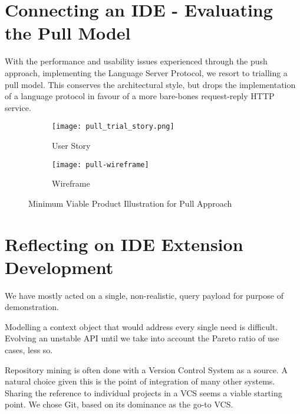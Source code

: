 \section{Connecting an IDE - Evaluating the Pull Model}

With the performance and usability issues experienced through the push approach, implementing the Language Server Protocol, we resort to trialling a pull model. This conserves the architectural style, but drops the implementation of a language protocol in favour of a more bare-bones request-reply HTTP service. 

\begin{figure}[h!]
	\centering
	\begin{subfigure}[t]{0.3\textwidth}
		\texttt{[image: pull\_trial\_story.png]}
		\caption{User Story}
	\end{subfigure}
	\begin{subfigure}[t]{0.6\textwidth}
		\texttt{[image: pull-wireframe]}
		\caption{Wireframe}
	\end{subfigure}
	\label{fig:mvpPull}
	\caption{Minimum Viable Product Illustration for Pull Approach}
\end{figure}

\section{Reflecting on IDE Extension Development}
We have mostly acted on a single, non-realistic, query payload for purpose of demonstration. 


Modelling a context object that would address every single need is difficult. Evolving an unstable API until we take into account the Pareto ratio of use cases, less so. 

Repository mining is often done with a Version Control System as a source. A natural choice given this is the point of integration of many other systems. Sharing the reference to individual projects in a VCS seems a viable starting  point. We chose Git, based on its dominance as the go-to VCS.


